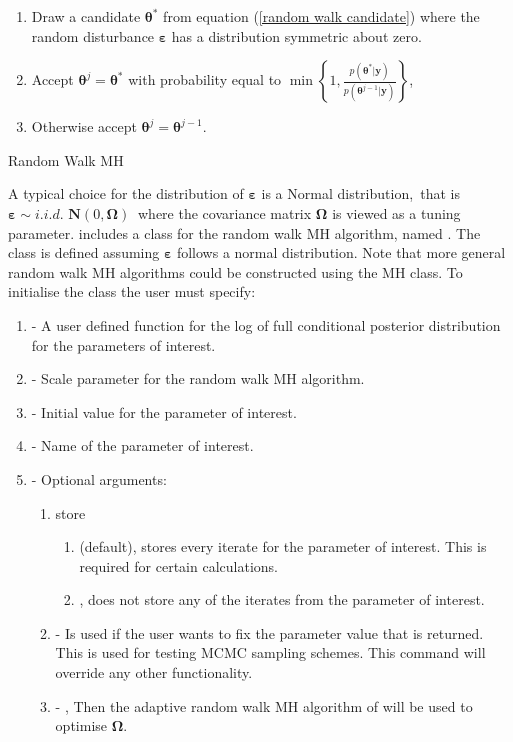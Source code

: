\documentclass[article]{jss}
\begin{document}
%
\begin{algorithm}[H]
  \begin{enumerate}
  \item Draw a candidate $\bm{\theta}^{\ast}$ from equation
    (\ref{random walk candidate}) where the random disturbance
    $\bm{\varepsilon}$ has a distribution symmetric about zero.
  \item Accept $\bm{\theta}^{j}=\bm{\theta}^{\ast}$ with probability
    equal to $\min\left\{
      1,\frac{p\left(\bm{\theta}^{\ast}|\bm{y}\right)}{p\left(\bm{\theta}^{j-1}|\bm{y}\right)}\right\}
    $,
  \item Otherwise accept $\bm{\theta}^{j}=\bm{\theta}^{j-1}.$
  \end{enumerate}
  \caption{Random Walk MH}
\label{alg:rwmh}
\end{algorithm}


A typical choice for the distribution of $\bm{\bm{\varepsilon}}$ is a
Normal distribution,\emph{\ }that is $\bm{\varepsilon\sim}i.i.d.$
$\bm{N}\left(0,\bm{\Omega}\right)\ $ where the covariance matrix
$\bm{\Omega}$ is viewed as a tuning parameter.  includes a
class for the random walk MH algorithm, named . The class
 is defined assuming $\bm{\varepsilon}$ follows a normal
distribution. Note that more general random walk MH algorithms could
be constructed using the MH class. To initialise the class the user
must specify:
\begin{enumerate}
\item {} - A user defined function for the log of full
  conditional posterior distribution for the parameters of interest.
\item {} - Scale parameter for the random walk MH algorithm.
\item {} - Initial value for the parameter of interest.
\item {} - Name of the parameter of interest.
\item {} - Optional arguments:

  \begin{enumerate}
  \item store
    \begin{enumerate}
    \item {} (default), stores every iterate for the
      parameter of interest. This is required for certain
      calculations.
    \item {}, does not store any of the iterates from the
      parameter of interest.
    \end{enumerate}
  \item {} - Is used if the user wants to fix the
    parameter value that is returned. This is used for testing MCMC
    sampling schemes.  This command will override any other
    functionality.
  \item {} - , Then the adaptive random walk
    MH algorithm of \citet{GarthwaiteYanScisson2010} will be used to
    optimise $\bm{\Omega}.$
  \end{enumerate}
\end{enumerate}
\end{document}
